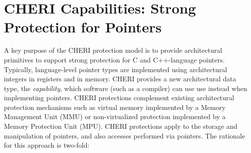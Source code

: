 \section{CHERI Capabilities: Strong Protection for Pointers}

A key purpose of the CHERI protection model is to provide architectural
primitives to support strong protection for C and C++-language pointers.
Typically, language-level pointer types are implemented using architectural
integers in registers and in memory.
CHERI provides a new architectural data type, the \textit{capability}, which
software (such as a compiler) can use use instead when implementing pointers.
CHERI protections complement existing architectural protection mechanisms
such as virtual memory implemented by a Memory Management Unit (MMU) or
non-virtualized protection implemented by a Memory Protection Unit (MPU).
CHERI protections apply to the storage and manipulation of pointers, and also
accesses performed via pointers.
The rationale for this approach is two-fold:

